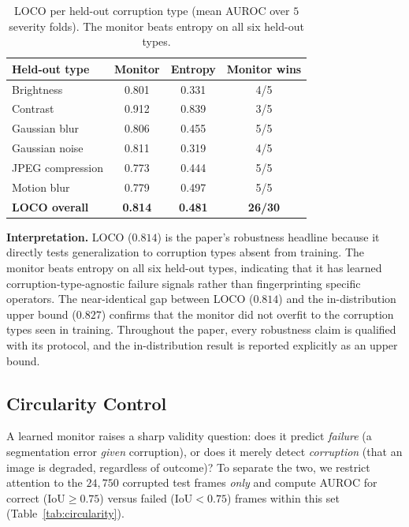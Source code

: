 \documentclass[letterpaper, 10 pt, conference]{ieeeconf}  %
\newcommand{\iou}{\mathrm{IoU}}
\begin{document}
\begin{table}[t]
\caption{LOCO per held-out corruption type (mean AUROC over $5$ severity folds). The monitor beats entropy on all six held-out types.}
\label{tab:loco}
\centering
\small
\begin{tabular}{lccc}
\toprule
Held-out type & Monitor & Entropy & Monitor wins \\
\midrule
Brightness        & 0.801 & 0.331 & 4/5 \\
Contrast          & 0.912 & 0.839 & 3/5 \\
Gaussian blur     & 0.806 & 0.455 & 5/5 \\
Gaussian noise    & 0.811 & 0.319 & 4/5 \\
JPEG compression  & 0.773 & 0.444 & 5/5 \\
Motion blur       & 0.779 & 0.497 & 5/5 \\
\midrule
\textbf{LOCO overall} & \textbf{0.814} & \textbf{0.481} & \textbf{26/30} \\
\bottomrule
\end{tabular}
\end{table}

\textbf{Interpretation.} LOCO ($0.814$) is the paper's robustness headline
because it directly tests generalization to corruption types absent from
training. The monitor beats entropy on all six held-out types, indicating
that it has learned corruption-type-agnostic failure signals rather than
fingerprinting specific operators. The near-identical gap between LOCO
($0.814$) and the in-distribution upper bound ($0.827$) confirms that the
monitor did not overfit to the corruption types seen in training. Throughout
the paper, every robustness claim is qualified with its protocol, and the
in-distribution result is reported explicitly as an upper bound.

\subsection{Circularity Control}

A learned monitor raises a sharp validity question: does it predict
\emph{failure} (a segmentation error \emph{given} corruption), or does it
merely detect \emph{corruption} (that an image is degraded, regardless of
outcome)? To separate the two, we restrict attention to the $24{,}750$
corrupted test frames \emph{only} and compute AUROC for correct
($\iou \ge 0.75$) versus failed ($\iou < 0.75$) frames within this set
(Table~\ref{tab:circularity}).
\end{document}
